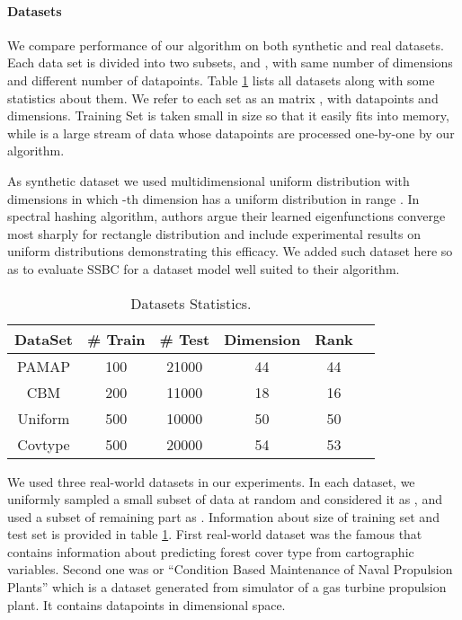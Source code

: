 \documentclass{sig-alternate}
\begin{document}
\paragraph{Datasets}
We compare performance of our algorithm on both synthetic and real datasets.
Each data set is divided into two subsets,  and , with same number of dimensions and different number of datapoints. 
Table \ref{tbl:datasets} lists all datasets along with some statistics about them.
We refer to each set as an  matrix , with  datapoints and  dimensions. Training Set is taken small in size so that it easily fits into memory, while  is a large stream of data whose datapoints are processed one-by-one by our algorithm.    

As synthetic dataset we used multidimensional uniform distribution with  dimensions in which -th dimension  has a uniform distribution in range . In spectral hashing algorithm\cite{weiss2009spectral}, authors argue their learned eigenfunctions converge most sharply for rectangle distribution and include experimental results on uniform distributions demonstrating this efficacy. We added such dataset here so as to evaluate SSBC for a dataset model well suited to their algorithm.

\begin{table}[t!!!!]
\begin{center}
\begin{tabular}{|c||c|c|c|c|c|}
\hline
\textbf{DataSet} & \textbf{\# Train} & \textbf{\# Test} & \textbf{Dimension} & \textbf{Rank} \\
\hline
\hline
\textsf{PAMAP} & 100 & 21000 & 44 & 44 \\
\hline
\textsf{CBM}& 200 & 11000 & 18 & 16  \\  
\hline   
\textsf{Uniform} & 500 & 10000 & 50 & 50 \\
\hline 
\textsf{Covtype} & 500 & 20000 & 54 & 53 \\  
\hline 
\end{tabular} 
\end{center}
\vspace{-2mm}
\caption{\label{tbl:datasets} Datasets Statistics.}
\end{table}

We used three real-world datasets in our experiments. In each dataset, we uniformly sampled a small subset of data at random and considered it as , and used a subset of remaining part as . Information about size of training set and test set is provided in table \ref{tbl:datasets}.
First real-world dataset was the famous \cite{Covtype} that contains information about predicting forest cover type from cartographic variables.
Second one was  or ``Condition Based Maintenance of Naval Propulsion Plants''\cite{Coraddu2013Machine} which is a dataset generated from simulator of a gas turbine propulsion plant. It contains  datapoints in  dimensional space.
\end{document}
